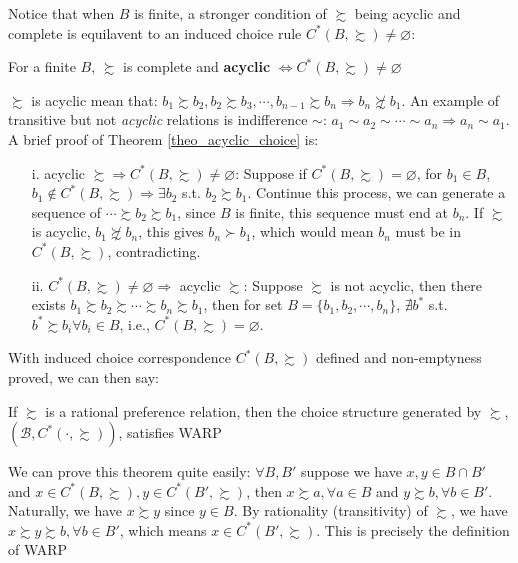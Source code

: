 Notice that when $B$ is finite, a stronger condition of $\succsim$ being acyclic and complete is equilavent to an induced choice rule $C^*(B,\succsim)\neq \varnothing$: 
\begin{theorem}\label{theo_acyclic_choice}
    For a finite $B$, $\succsim$ is complete and \textbf{acyclic} $\Leftrightarrow C^*(B,\succsim)\neq \varnothing$
\end{theorem}
$\succsim$ is acyclic mean that: $b_1\succsim b_2,b_2\succsim b_3,\cdots, b_{n-1}\succsim b_n\Rightarrow b_n\not\succsim b_1$. An example of transitive but not \textit{acyclic} relations is indifference $\sim$: $a_1\sim a_2\sim \cdots\sim a_n\Rightarrow a_n\sim a_1$.
A brief proof of Theorem \ref{theo_acyclic_choice} is:
\begin{enumerate}
    \item[i.] acyclic $\succsim\Rightarrow C^*(B,\succsim)\neq\varnothing$: Suppose if $C^*(B,\succsim)=\varnothing$, for $b_1\in B$, $b_1\notin C^*(B,\succsim)\Rightarrow \exists b_2$ s.t. $b_2\succsim b_1$. Continue this process, we can generate a sequence of $\cdots\succsim b_2\succsim b_1$, since $B$ is finite, this sequence must end at $b_n$. If $\succsim$ is acyclic, $b_1\not\succsim b_n$, this gives $b_n\succ b_1$, which would mean $b_n$ must be in $C^*(B,\succsim)$, contradicting.
    \item[ii.] $C^*(B,\succsim)\neq\varnothing\Rightarrow$ acyclic $\succsim$: Suppose $\succsim$ is not acyclic, then there exists $b_1\succsim b_2\succsim \cdots\succsim b_n\succsim b_1$, then for set $B=\{b_1,b_2,\cdots,b_n\}$, $\nexists b^*$ s.t. $b^*\succsim b_i \forall b_i\in B$, i.e., $C^*(B,\succsim)=\varnothing$.
\end{enumerate}

With induced choice correspondence $C^*(B,\succsim)$ defined and non-emptyness proved, we can then say:
\begin{theorem}\label{thm_rational_leadto_WARP}
    If $\succsim$ is a rational preference relation, then the choice structure generated by $\succsim$, $(\mathcal{B},C^*(\cdot,\succsim))$, satisfies WARP
\end{theorem}

We can prove this theorem quite easily: $\forall B,B'$ suppose we have $x,y\in B\cap B'$ and $x\in C^*(B,\succsim),y\in C^*(B',\succsim)$, then $x\succsim a, \forall a\in B$ and $y\succsim b,\forall b\in B'$. Naturally, we have $x\succsim y$ since $y\in B$. By rationality (transitivity) of $\succsim$, we have $x\succsim y\succsim b,\forall b\in B'$, which means $x\in C^*(B',\succsim)$. This is precisely the definition of WARP

